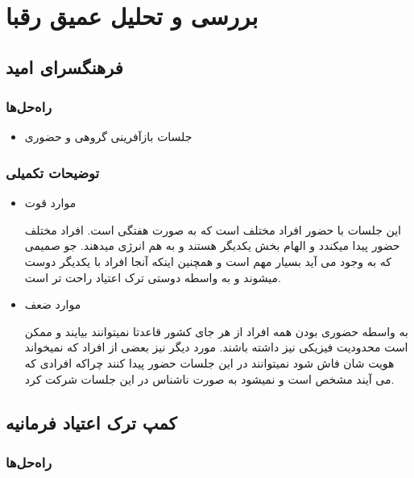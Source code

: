 \documentclass[dvipsnames, svgnames, x11names, 11pt]{article}
\begin{document}
\section{بررسی و تحلیل عمیق رقبا}

\subsection{فرهنگسرای امید}
\subsubsection{راه‌حل‌ها}
\begin{itemize}
\item 
جلسات بازآفرینی گروهی و حضوری
\end{itemize}

\subsubsection{توضیحات تکمیلی}
\begin{itemize}
\item 
موارد قوت

این جلسات با حضور افراد مختلف است که به صورت هفتگی است. افراد مختلف حضور پیدا میکندد و الهام بخش یکدیگر هستند و به هم انرژی میدهند. جو صمیمی که به وجود می آید بسیار مهم است و همچنین اینکه آنجا افراد با یکدیگر دوست میشوند و به واسطه دوستی ترک اعتیاد راحت تر است.

\item
موارد ضعف

به واسطه حضوری بودن همه افراد از هر جای کشور قاعدتا نمیتوانند بیایند و ممکن است محدودیت فیزیکی نیز داشته باشند. مورد دیگر نیز بعضی از افراد که نمیخواند هویت شان فاش شود نمیتوانند در این جلسات حضور پیدا کنند چراکه افرادی که می آیند مشخص است و نمیشود به صورت ناشناس در این جلسات شرکت کرد.
\end{itemize}


\subsection{کمپ ترک اعتیاد فرمانیه}
\subsubsection{راه‌حل‌ها}
\end{document}
